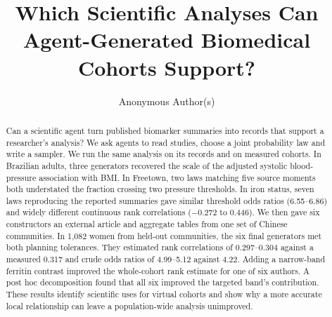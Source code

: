 \documentclass[sigconf,anonymous,review]{acmart}
\begin{document}
\title[Which Analyses Can Agent-Generated Cohorts Support?]{Which Scientific Analyses Can Agent-Gener\-ated Biomedical Cohorts Support?}
\author{Anonymous Author(s)}

\begin{abstract}
Can a scientific agent turn published biomarker summaries into records that support a researcher's analysis? We ask agents to read studies, choose a joint probability law and write a sampler. We run the same analysis on its records and on measured cohorts. In Brazilian adults, three generators recovered the scale of the adjusted systolic blood-pressure association with BMI. In Freetown, two laws matching five source moments both understated the fraction crossing two pressure thresholds. In iron status, seven laws reproducing the reported summaries gave similar threshold odds ratios (6.55--6.86) and widely different continuous rank correlations ($-0.272$ to $0.446$). We then gave six constructors an external article and aggregate tables from one set of Chinese communities. In 1,082 women from held-out communities, the six final generators met both planning tolerances. They estimated rank correlations of 0.297--0.304 against a measured 0.317 and crude odds ratios of 4.99--5.12 against 4.22. Adding a narrow-band ferritin contrast improved the whole-cohort rank estimate for one of six authors. A post hoc decomposition found that all six improved the targeted band's contribution. These results identify scientific uses for virtual cohorts and show why a more accurate local relationship can leave a population-wide analysis unimproved.
\end{abstract}

\maketitle
\end{document}
